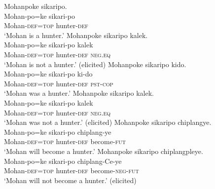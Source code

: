 \documentclass[output=paper,colorlinks,citecolor=brown]{langscibook}
\begin{document}
\newpage
\ea\label{ex:amr:18} 
    \ea\label{ex:amr:18a} Mohanpoke sikaripo.  \\ 
        \gll Mohan-po=ke sikari-po \\
               Mohan-\textsc{def}=\textsc{top} hunter-\textsc{def} \\
        \glt ‘Mohan is a hunter.’ 
    \ex\label{ex:amr:18b}Mohanpoke sikaripo kalek.  \\
        \gll Mohan-po=ke sikari-po kalek\\
              Mohan-\textsc{def}=\textsc{top} hunter-\textsc{def} \textsc{neg}.\textsc{eq}\\
        \glt ‘Mohan is not a hunter.’ (elicited)
    \z
\z 
\ea\label{ex:amr:18+}
    \ea\label{ex:amr:18c}Mohanpoke sikaripo kido.  \\ 
        \gll Mohan-po=ke sikari-po ki-do \\
              Mohan-\textsc{def}=\textsc{top} hunter-\textsc{def} \textsc{pst}{}-\textsc{cop} \\
        \glt ‘Mohan was a hunter.’ 
    \ex\label{ex:amr:18d} Mohanpoke sikaripo kalek.  \\
        \gll Mohan-po=ke sikari-po kalek\\
              Mohan-\textsc{def}=\textsc{top} hunter-\textsc{def} \textsc{neg}.\textsc{eq}\\
        \glt ‘Mohan was not a hunter.’ (elicited)
    \z 
\z 
\ea\label{ex:amr:18++}
    \ea\label{ex:amr:18e} Mohanpoke sikaripo chiplangye.  \\ 
        \gll Mohan-po=ke sikari-po chiplang-ye \\
              Mohan-\textsc{def}=\textsc{top} hunter-\textsc{def} become\textsc{{}-fut} \\
        \glt ‘Mohan will become a hunter.’ 
    \ex\label{ex:amr:18f} Mohanpoke sikaripo chiplangpleye.  \\
        \gll  Mohan-po=ke sikari-po chiplang-Ce-ye \\
              Mohan-\textsc{def}=\textsc{top} hunter-\textsc{def} become-\textsc{neg-fut} \\
        \glt ‘Mohan will not become a hunter.’ (elicited)
    \z
\z 
\end{document}
